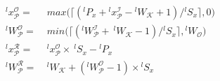 \begin{align}
\label{eqn:xcoordinate}
^lx^\mathcal{O}_\mathcal{P} =&~ max\big(\lceil (^lP_x + {}^lx^\mathcal{I}_\mathcal{P} - {}^lW_\mathcal{K} + 1)/{}^lS_x \rceil, 0\big)\\
\label{eqn:patchwidth}
^lW^\mathcal{O}_\mathcal{P} =&~ min\big(\lceil (^lW^\mathcal{I}_\mathcal{P} +~ ^lW_\mathcal{K} - 1)/{}^lS_x \rceil, {}^lW_{\mathcal{O}}\big)\\
\label{eqn:xreadcoordinate}
^lx^\mathcal{R}_\mathcal{P} =&~ ^lx^\mathcal{O}_\mathcal{P} \times~ ^lS_x - {}^lP_x\\
\label{eqn:readpatchwidth}
^lW^\mathcal{R}_\mathcal{P} =&~ ^lW_\mathcal{K} + (^lW^\mathcal{O}_\mathcal{P}-1) \times {}^lS_x
\end{align}







